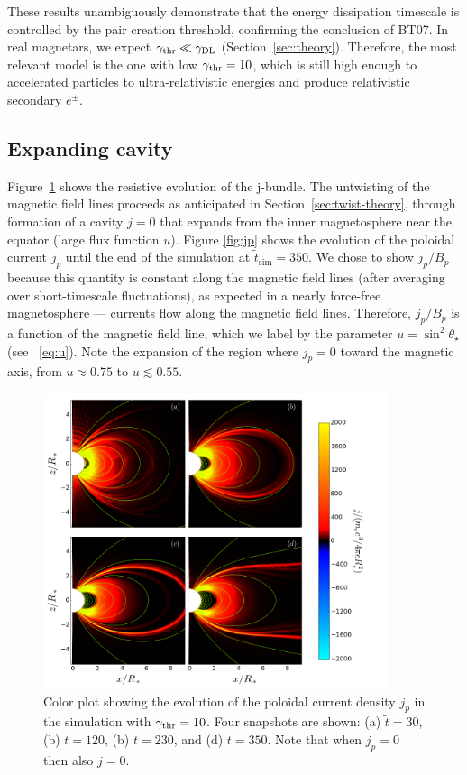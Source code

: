 These results unambiguously demonstrate that the energy dissipation timescale is
controlled by the pair creation threshold, confirming the conclusion of BT07.
In real magnetars, we expect $\gamma_{\rm thr}\ll\gamma_{\rm DL}$ (Section~\ref{sec:theory}).
Therefore, the most relevant model is the one with low $\gamma_{\rm thr}=10$, which is still high
enough to accelerated particles to ultra-relativistic energies and produce relativistic
secondary $e^\pm$.

\subsection{Expanding cavity}
\label{sec:untwisting}

Figure~\ref{fig:current} shows the resistive evolution of the j-bundle.
The untwisting of the magnetic field lines proceeds as anticipated
in
Section~\ref{sec:twist-theory}, through formation of a cavity $j=0$ that expands
from the inner magnetosphere near the equator (large flux function $u$).
Figure \ref{fig:jp} shows the evolution of the poloidal current $j_p$ until
the end of the simulation at $\tilde{t}_\mathrm{sim}=350$.
We chose to show $j_p/B_p$ because this quantity is constant along the magnetic
field lines (after averaging over short-timescale fluctuations), as expected in
a nearly force-free magnetosphere --- currents flow along the magnetic field lines.
Therefore, $j_p/B_p$ is a function of the magnetic field line, which we label
by the parameter $u=\sin^2\theta_\star$ (see \Eq~\ref{eq:u}).
Note the expansion of the region where $j_p = 0$ toward the magnetic axis,
from $u\approx 0.75$ to $u\lesssim 0.55$.

\begin{figure}[t]
  \centering
  \includegraphics[width=0.9\textwidth]{pics/chap4/j-p-color.png}
  \caption[Evolution of the poloidal current density in magnetar
  magnetosphere]{Color plot showing the evolution of the poloidal current
    density $j_p$ in the simulation with $\gamma_{\rm thr}=10$. Four snapshots are shown:
    (a) $\tilde{t}=30$, (b) $\tilde{t}=120$, (b) $\tilde{t}=230$, and (d)
    $\tilde{t}=350$. Note that when $j_p=0$ then also $j=0$.}
  \label{fig:current}
\end{figure}


